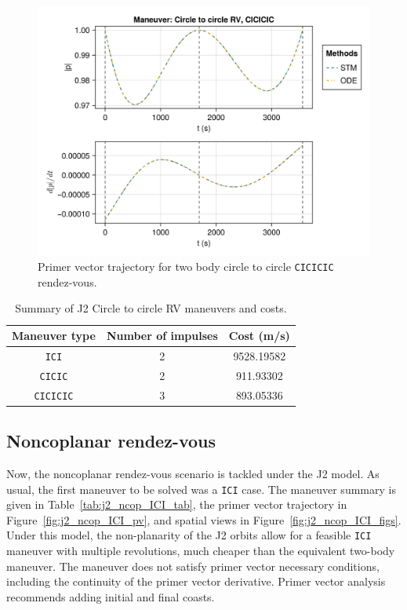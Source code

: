 \begin{figure}[htbp]
    \centering
    \includegraphics[width=\linewidth]{../results/j2/hohmann/CICICIC_primer_vector.png}
    \caption{Primer vector trajectory for two body circle to circle \texttt{CICICIC} rendez-vous.}
    \label{fig:j2_c2c_CICICIC_pv}
\end{figure}

\begin{table}[htbp]
    \centering
    \begin{tabular}{ccc} \toprule
        Maneuver type & Number of impulses & Cost (m/s) \\ \midrule
        \texttt{ICI} & 2 & 9528.19582 \\
        \texttt{CICIC} & 2 & 911.93302 \\
        \texttt{CICICIC} & 3 & 893.05336 \\\bottomrule
    \end{tabular}
    \caption{Summary of J2 Circle to circle RV maneuvers and costs.}
    \label{tab:J2_ctcr_summary}
\end{table}

\subsection{Noncoplanar rendez-vous}

Now, the noncoplanar rendez-vous scenario is tackled under the J2 model. As usual, the first maneuver to be solved was a \texttt{ICI} case. The maneuver summary is given in Table~\ref{tab:j2_ncop_ICI_tab}, the primer vector trajectory in Figure~\ref{fig:j2_ncop_ICI_pv}, and spatial views in Figure~\ref{fig:j2_ncop_ICI_figs}. Under this model, the non-planarity of the J2 orbits allow for a feasible \texttt{ICI} maneuver with multiple revolutions, much cheaper than the equivalent two-body maneuver. The maneuver does not satisfy primer vector necessary conditions, including the continuity of the primer vector derivative. Primer vector analysis recommends adding initial and final coasts.

